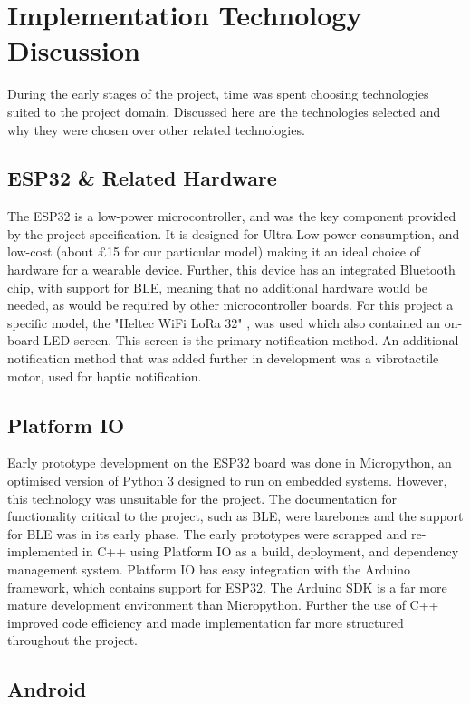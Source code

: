 \documentclass{l4proj}
\begin{document}
\section{Implementation Technology Discussion}

During the early stages of the project, time was spent choosing technologies suited to the project domain. Discussed here are the technologies selected and why they were chosen over other related technologies.

\subsection{ESP32 \& Related Hardware}

The ESP32 is a low-power microcontroller, and was the key component provided by the project specification. It is designed for Ultra-Low power consumption, and low-cost (about £15 for our particular model) making it an ideal choice of hardware for a wearable device. Further, this device has an integrated Bluetooth chip, with support for BLE, meaning that no additional hardware would be needed, as would be required by other microcontroller boards. For this project a specific model, the "Heltec WiFi LoRa 32" \citep{heltec_automation_wifi_nodate}, was used which also contained an on-board LED screen. This screen is the primary notification method. An additional notification method that was added further in development was a vibrotactile motor, used for haptic notification.

\subsection{Platform IO}

Early prototype development on the ESP32 board was done in Micropython, an optimised version of Python 3 designed to run on embedded systems. However, this technology was unsuitable for the project. The documentation for functionality critical to the project, such as BLE, were barebones and the support for BLE was in its early phase. The early prototypes were scrapped and re-implemented in C++ using Platform IO as a build, deployment, and dependency management system. Platform IO has easy integration with the Arduino framework, which contains support for ESP32. The Arduino SDK is a far more mature development environment than Micropython. Further the use of C++ improved code efficiency and made implementation far more structured throughout the project.

\subsection{Android}
\end{document}
